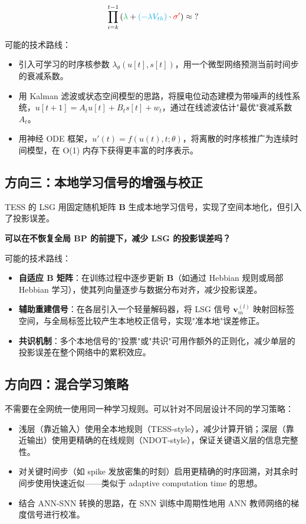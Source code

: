 \documentclass[journal,12pt,onecolumn]{IEEEtran}
\begin{document}
\begin{equation}
\prod_{i=k}^{t-1} \left({\color[rgb]{0,0.69,0.31}{\lambda}} + {\color{cyan}{(-\lambda V_{th})}}\cdot{\color{red}{\sigma'}}\right)
\approx \text{?}
\label{eq.kernel_approx}
\end{equation}

可能的技术路线：
\begin{itemize}
    \item 引入可学习的时序核参数 $\lambda_{\theta}(u[t], s[t])$，用一个微型网络预测当前时间步的衰减系数。
    \item 用 Kalman 滤波或状态空间模型的思路，将膜电位动态建模为带噪声的线性系统，$u[t+1] = A_t u[t] + B_t s[t] + w_t$，通过在线滤波估计"最优"衰减系数 $A_t$。
    \item 用神经 ODE 框架，$u'(t) = f(u(t), t; \theta)$，将离散的时序核推广为连续时间模型，在 O(1) 内存下获得更丰富的时序表示。
\end{itemize}

\subsection{方向三：本地学习信号的增强与校正}

TESS 的 LSG 用固定随机矩阵 $\mathbf{B}$ 生成本地学习信号，实现了空间本地化，但引入了投影误差。

\textbf{可以在不恢复全局 BP 的前提下，减少 LSG 的投影误差吗？}

可能的技术路线：
\begin{itemize}
    \item \textbf{自适应 $\mathbf{B}$ 矩阵}：在训练过程中逐步更新 $\mathbf{B}$（如通过 Hebbian 规则或局部 Hebbian 学习），使其列向量逐步与数据分布对齐，减少投影误差。
    \item \textbf{辅助重建信号}：在各层引入一个轻量解码器，将 LSG 信号 $\mathbf{v}_m^{(l)}$ 映射回标签空间，与全局标签比较产生本地校正信号，实现"准本地"误差修正。
    \item \textbf{共识机制}：多个本地信号的"投票"或"共识"可用作额外的正则化，减少单层的投影误差在整个网络中的累积效应。
\end{itemize}

\subsection{方向四：混合学习策略}

不需要在全网统一使用同一种学习规则。可以针对不同层设计不同的学习策略：

\begin{itemize}
    \item 浅层（靠近输入）使用全本地规则（TESS-style），减少计算开销；深层（靠近输出）使用更精确的在线规则（NDOT-style），保证关键语义层的信息完整性。
    \item 对关键时间步（如 spike 发放密集的时刻）启用更精确的时序回溯，对其余时间步使用快速近似——类似于 adaptive computation time 的思想。
    \item 结合 ANN-SNN 转换的思路，在 SNN 训练中周期性地用 ANN 教师网络的梯度信号进行校准。
\end{itemize}
\end{document}
